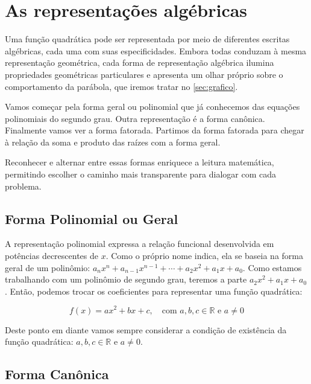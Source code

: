 \documentclass[12pt,a4paper]{report}
\begin{document}
\tableofcontents
\thispagestyle{empty}

\vspace{1cm} %

\chapter{As representações algébricas}
\label{sec:algebricas}

	Uma função quadrática pode ser representada por meio de diferentes escritas algébricas, cada uma com suas especificidades. Embora todas conduzam à mesma representação geométrica, cada forma de representação algébrica ilumina propriedades geométricas particulares e apresenta um olhar próprio sobre o comportamento da parábola, que iremos tratar no \autoref{sec:grafico}.
	
	Vamos começar pela forma geral ou polinomial que já conhecemos das equações polinomiais do segundo grau. Outra representação é a forma canônica. Finalmente vamos ver a forma fatorada. Partimos da forma fatorada para chegar à relação da soma e produto das raízes com a forma geral.
	
	Reconhecer e alternar entre essas formas enriquece a leitura matemática, permitindo escolher o caminho mais transparente para dialogar com cada problema.
	
	
	\section{Forma Polinomial ou Geral}
	\label{subsec:geral}
	
	A representação polinomial expressa a relação funcional desenvolvida em potências decrescentes de $x$. Como o próprio nome indica, ela se baseia na forma geral de um polinômio: $a_n x^n + a_{n-1} x^{n-1}+ \cdots+ a_2 x^2 + a_1 x + a_0$. Como estamos trabalhando com um polinômio de segundo grau, teremos a parte $a_2 x^2 + a_1 x + a_0$. Então, podemos trocar os coeficientes para representar uma função quadrática:
	
	
	\begin{destaque}
		\label{dest:formageral}
		$$f(x) = ax^2 + bx + c, \quad \text{com } a, b, c \in \mathbb{R} \text{ e } a \neq 0$$
	\end{destaque}
	
	Deste ponto em diante vamos sempre considerar a condição de existência da função quadrática: $a, b, c \in \mathbb{R} \text{ e } a \neq 0$.
	\section{Forma Canônica}
	\label{subsec:canonica}
	
\end{document}
